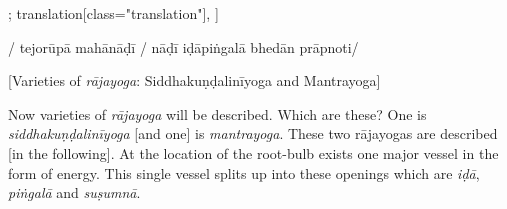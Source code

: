 \documentclass[12pt]{article}%
\def\om{\textrm{\footnotesize \textit{omitted in}\ }} %
\begin{document}
\begin{alignment}[
    texts=edition[class="edition"];
    translation[class="translation"],
  ]
\begin{edition}
\begin{prose}
       /
       tejorūpā mahānāḍī
       /
nāḍī iḍāpiṅgalā
  bhedān prāpnoti/\end{prose}
    \end{edition}
    \begin{translation}
        \bigskip
    \centerline{\textrm{\small{[Varieties of \textit{rājayoga}: Siddhakuṇḍalinīyoga and Mantrayoga]}}}
    \bigskip
    \begin{tlate}Now varieties of \textit{rājayoga} will be described. Which are these? One is \textit{siddhakuṇḍalinīyoga} [and one] is \textit{mantrayoga}. These two rājayogas are described [in the following]. At the location of the root-bulb exists one major vessel in the form of energy. This single vessel splits up into these openings which are \textit{iḍā}, \textit{piṅgalā} and \textit{suṣumnā}. \end{tlate}

\end{translation}
\end{alignment}
\end{document}
